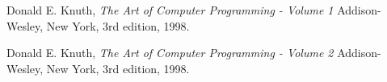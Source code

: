 \documentclass[12pt]{article}
\begin{document}
\newpage

\begin{thebibliography}{4}
	
	 Donald E. Knuth,
	 \emph{The Art of Computer Programming - Volume 1}
	 Addison-Wesley, New York, 3rd edition,  1998.
	 
	 Donald E. Knuth,
	 \emph{The Art of Computer Programming - Volume 2}
	 Addison-Wesley, New York, 3rd edition,  1998.
	
\end{thebibliography}
\end{document}
